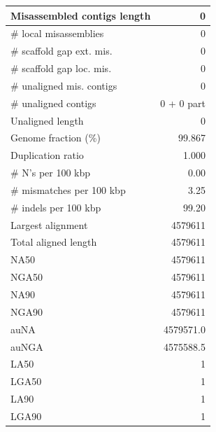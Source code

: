 \documentclass[12pt,a4paper]{article}
\begin{document}
\begin{table}[ht]
\begin{center}
\begin{tabular}{|l*{1}{|r}|}
Misassembled contigs length & 0 \\ \hline
\# local misassemblies & 0 \\ \hline
\# scaffold gap ext. mis. & 0 \\ \hline
\# scaffold gap loc. mis. & 0 \\ \hline
\# unaligned mis. contigs & 0 \\ \hline
\# unaligned contigs & 0 + 0 part \\ \hline
Unaligned length & 0 \\ \hline
Genome fraction (\%) & 99.867 \\ \hline
Duplication ratio & 1.000 \\ \hline
\# N's per 100 kbp & 0.00 \\ \hline
\# mismatches per 100 kbp & 3.25 \\ \hline
\# indels per 100 kbp & 99.20 \\ \hline
Largest alignment & 4579611 \\ \hline
Total aligned length & 4579611 \\ \hline
NA50 & 4579611 \\ \hline
NGA50 & 4579611 \\ \hline
NA90 & 4579611 \\ \hline
NGA90 & 4579611 \\ \hline
auNA & 4579571.0 \\ \hline
auNGA & 4575588.5 \\ \hline
LA50 & 1 \\ \hline
LGA50 & 1 \\ \hline
LA90 & 1 \\ \hline
LGA90 & 1 \\ \hline
\end{tabular}
\end{center}
\end{table}
\end{document}
